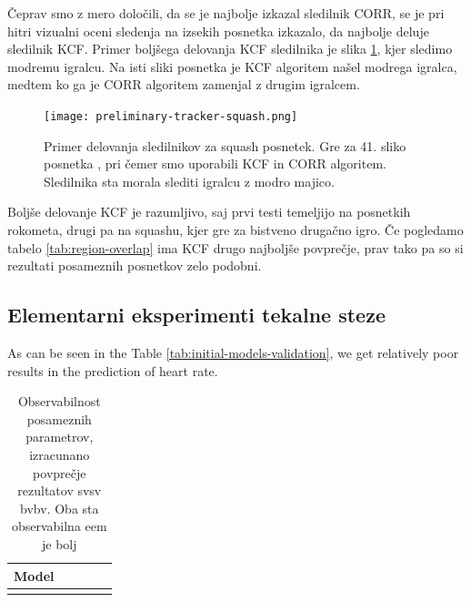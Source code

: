 Čeprav smo z mero določili, da se je najbolje izkazal sledilnik CORR, se je pri hitri vizualni oceni sledenja na izsekih posnetka \cite{squashtv2014squash} izkazalo, da najbolje deluje sledilnik KCF. Primer boljšega delovanja KCF sledilnika je slika \ref{fig:squash-tracker-visual}, kjer sledimo modremu igralcu. Na isti sliki posnetka je KCF algoritem našel modrega igralca, medtem ko ga je CORR algoritem zamenjal z drugim igralcem. 



\begin{figure}[!htbp]
	\centering
	\texttt{[image: preliminary-tracker-squash.png]}
	\caption{}
	\caption[Primer delovanja sledilnikov za squash posnetek]{Primer delovanja sledilnikov za squash posnetek. Gre za 41. sliko posnetka \cite{squashtv2014squash}, pri čemer smo uporabili KCF in CORR algoritem. Sledilnika sta morala slediti igralcu z modro majico.}
	\label{fig:squash-tracker-visual}
\end{figure}


Boljše delovanje KCF je razumljivo, saj prvi testi temeljijo na posnetkih rokometa, drugi pa na squashu, kjer gre za bistveno drugačno igro. Če pogledamo tabelo \ref{tab:region-overlap} ima KCF drugo najboljše povprečje, prav tako pa so si rezultati posameznih posnetkov zelo podobni. 


















\subsection{Elementarni eksperimenti tekalne steze}
As can be seen in the Table \ref{tab:initial-models-validation}, we get relatively poor results in the prediction of heart rate.


\begin{table}[!htbp]
	\centering
	\begin{tabular}{l S[table-format=1.2, round-mode=places, round-precision=2] S[table-format=1.2, round-mode=places, round-precision=2] S[table-format=1.2, round-mode=places, round-precision=2] S[table-format=1.2, round-mode=places, round-precision=2]}
		\toprule
		\textbf{Model} &  &  &  &  \\
		\midrule
		\bottomrule
	\end{tabular}
	\caption{Observabilnost posameznih parametrov, izracunano povprečje rezultatov svsv bvbv. Oba sta observabilna eem je bolj}
	\label{tab:observabilnost}
\end{table}


